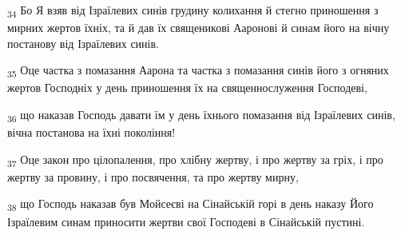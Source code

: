 \begin{tcolorbox}
\textsubscript{34} Бо Я взяв від Ізраїлевих синів грудину колихання й стегно приношення з мирних жертов їхніх, та й дав їх священикові Ааронові й синам його на вічну постанову від Ізраїлевих синів.
\end{tcolorbox}
\begin{tcolorbox}
\textsubscript{35} Оце частка з помазання Аарона та частка з помазання синів його з огняних жертов Господніх у день приношення їх на священнослуження Господеві,
\end{tcolorbox}
\begin{tcolorbox}
\textsubscript{36} що наказав Господь давати їм у день їхнього помазання від Ізраїлевих синів, вічна постанова на їхні покоління!
\end{tcolorbox}
\begin{tcolorbox}
\textsubscript{37} Оце закон про цілопалення, про хлібну жертву, і про жертву за гріх, і про жертву за провину, і про посвячення, та про жертву мирну,
\end{tcolorbox}
\begin{tcolorbox}
\textsubscript{38} що Господь наказав був Мойсеєві на Сінайській горі в день наказу Його Ізраїлевим синам приносити жертви свої Господеві в Сінайській пустині.
\end{tcolorbox}
